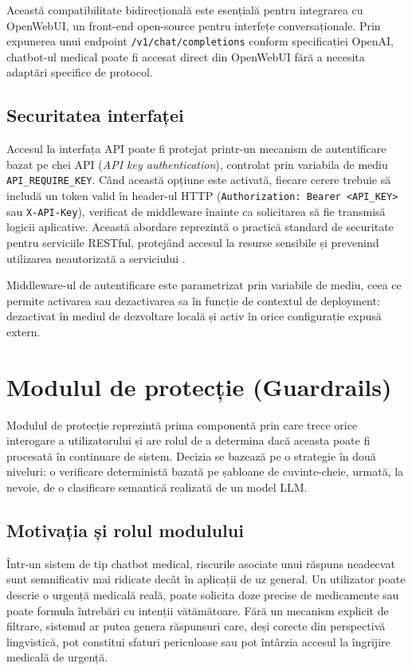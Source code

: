 \documentclass[12pt, a4paper, oneside, romanian]{teza-upb}
\begin{document}
Această compatibilitate bidirecțională este esențială pentru integrarea cu OpenWebUI, un front-end open-source pentru interfețe conversaționale. Prin expunerea unui endpoint \texttt{/v1/chat/completions} conform specificației OpenAI, chatbot-ul medical poate fi accesat direct din OpenWebUI fără a necesita adaptări specifice de protocol.

\subsection{Securitatea interfaței}

Accesul la interfața API poate fi protejat printr-un mecanism de autentificare bazat pe chei API (\textit{API key authentication}), controlat prin variabila de mediu \texttt{API\_REQUIRE\_KEY}. Când această opțiune este activată, fiecare cerere trebuie să includă un token valid în header-ul HTTP (\texttt{Authorization: Bearer <API\_KEY>} sau \texttt{X-API-Key}), verificat de middleware înainte ca solicitarea să fie transmisă logicii aplicative. Această abordare reprezintă o practică standard de securitate pentru serviciile RESTful, protejând accesul la resurse sensibile și prevenind utilizarea neautorizată a serviciului \cite{flask_doc}.

Middleware-ul de autentificare este parametrizat prin variabile de mediu, ceea ce permite activarea sau dezactivarea sa în funcție de contextul de deployment: dezactivat în mediul de dezvoltare locală și activ în orice configurație expusă extern.

\section{Modulul de protecție (Guardrails)}

Modulul de protecție reprezintă prima componentă prin care trece orice interogare a utilizatorului și are rolul de a determina dacă aceasta poate fi procesată în continuare de sistem. Decizia se bazează pe o strategie în două niveluri: o verificare deterministă bazată pe șabloane de cuvinte-cheie, urmată, la nevoie, de o clasificare semantică realizată de un model LLM.

\subsection{Motivația și rolul modulului}

Într-un sistem de tip chatbot medical, riscurile asociate unui răspuns neadecvat sunt semnificativ mai ridicate decât în aplicații de uz general. Un utilizator poate descrie o urgență medicală reală, poate solicita doze precise de medicamente sau poate formula întrebări cu intenții vătămătoare. Fără un mecanism explicit de filtrare, sistemul ar putea genera răspunsuri care, deși corecte din perspectivă lingvistică, pot constitui sfaturi periculoase sau pot întârzia accesul la îngrijire medicală de urgență.
\end{document}
